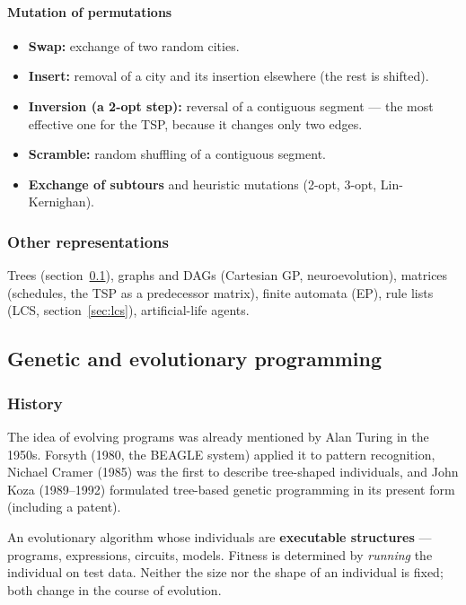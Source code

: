 \documentclass[11pt,a4paper]{article}
\theoremstyle{definition}
\begin{document}
\paragraph{Mutation of permutations}

\begin{itemize}
\item \textbf{Swap:} exchange of two random cities.
\item \textbf{Insert:} removal of a city and its insertion elsewhere (the rest
  is shifted).
\item \textbf{Inversion (a 2-opt step):} reversal of a contiguous segment ---
  the most effective one for the TSP, because it changes only two edges.
\item \textbf{Scramble:} random shuffling of a contiguous segment.
\item \textbf{Exchange of subtours} and heuristic mutations (2-opt, 3-opt,
  Lin-Kernighan).
\end{itemize}

\subsubsection{Other representations}

Trees (section~\ref{sec:gp}), graphs and DAGs (Cartesian GP, neuroevolution),
matrices (schedules, the TSP as a predecessor matrix), finite automata (EP),
rule lists (LCS, section~\ref{sec:lcs}), artificial-life agents.

\subsection{Genetic and evolutionary programming}
\label{sec:gp}
\subsubsection{History}

The idea of evolving programs was already mentioned by Alan Turing in the 1950s.
Forsyth (1980, the BEAGLE system) applied it to pattern recognition, Nichael
Cramer (1985) was the first to describe tree-shaped individuals, and John Koza
(1989--1992) formulated tree-based genetic programming in its present form
(including a patent).

\begin{defbox}
An evolutionary algorithm whose individuals are \textbf{executable structures}
--- programs, expressions, circuits, models. Fitness is determined by
\emph{running} the individual on test data. Neither the size nor the shape of an
individual is fixed; both change in the course of evolution.
\end{defbox}
\end{document}
